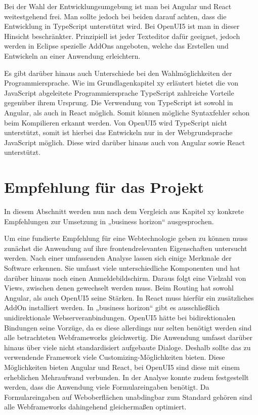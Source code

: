 Bei der Wahl der Entwicklungsumgebung ist man bei Angular und React weitestgehend frei. Man sollte jedoch bei beiden darauf achten, dass die Entwicklung in TypeScript unterstützt wird. Bei OpenUI5 ist man in dieser Hinsicht beschränkter. Prinzipiell ist jeder Texteditor dafür geeignet, jedoch werden in Eclipse spezielle AddOns angeboten, welche das Erstellen und Entwickeln an einer Anwendung erleichtern.

Es gibt darüber hinaus auch Unterschiede bei den Wahlmöglichkeiten der Programmiersprache. Wie im Grundlagenkapitel xy erläutert bietet die von JavaScript abgeleitete Programmiersprache TypeScript zahlreiche Vorteile gegenüber ihrem Ursprung. Die Verwendung von TypeScript ist sowohl in Angular, als auch in React möglich. Somit können mögliche Syntaxfehler schon beim Kompilieren erkannt werden. Von OpenUI5 wird TypeScript nicht unterstützt, somit ist hierbei das Entwickeln nur in der Webgrundsprache JavaScript möglich. Diese wird darüber hinaus auch von Angular sowie React unterstützt.




\section{Empfehlung für das Projekt}

In diesem Abschnitt werden nun nach dem Vergleich aus Kapitel xy konkrete Empfehlungen zur Umsetzung in „business horizon“ ausgesprochen.

Um eine fundierte Empfehlung für eine Webtechnologie geben zu können muss zunächst die Anwendung auf ihre frontendrelevanten Eigenschaften untersucht werden. Nach einer umfassenden Analyse lassen sich einige Merkmale der Software erkennen. 
Sie umfasst viele unterschiedliche Komponenten und hat darüber hinaus noch einen Anmeldebildschirm. Daraus folgt eine Vielzahl von Views, zwischen denen gewechselt werden muss. Beim Routing hat sowohl Angular, als auch OpenUI5 seine Stärken. In React muss hierfür ein zusätzliches AddOn installiert werden.
In „business horizon“ gibt es ausschließlich unidirektionale Webserveranbindungen. OpenUI5 hätte bei bidirektionalen Bindungen seine Vorzüge, da es diese allerdings nur selten benötigt werden sind alle betrachteten Webframeworks gleichwertig.
Die Anwendung umfasst darüber hinaus über viele nicht standardisiert aufgebaute Dialoge. Deshalb sollte das zu verwendende Framework viele Customizing-Möglichkeiten bieten. Diese Möglichkeiten bieten Angular und React, bei OpenUI5 sind diese mit einem erheblichen Mehraufwand verbunden.
In der Analyse konnte zudem festgestellt werden, dass die Anwendung viele Formulareingaben benötigt. Da Formulareingaben auf Weboberflächen unabdingbar zum Standard gehören sind alle Webframeworks dahingehend gleichermaßen optimiert.

